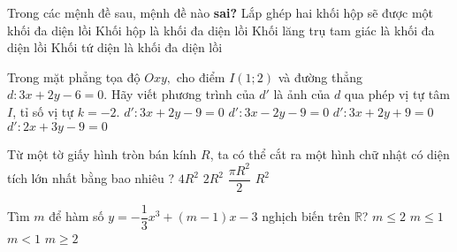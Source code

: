 \begin{ex}%
Trong các mệnh đề sau, mệnh đề nào {\textbf{sai?}}
	\choice
	{\True Lắp ghép hai khối hộp sẽ được một khối đa diện lồi}
	{Khối hộp là khối đa diện lồi}
	{Khối lăng trụ tam giác là khối đa diện lồi}
	{Khối tứ diện là khối đa diện lồi}
	\loigiai{
	}
	
\end{ex}
\begin{ex}%
Trong mặt phẳng tọa độ $Oxy,$ cho điểm $I\left(1;2 \right)$ và đường thẳng $d: 3x+2y-6=0.$ Hãy viết phương trình của $d'$ là ảnh của $d$ qua phép vị tự tâm $I$, tỉ số vị tự $k=-2$.
\choice
{\True $d':3x+2y-9=0$}
{$d':3x-2y-9=0$}
{$d':3x+2y+9=0$}
{$d':2x+3y-9=0$}
\end{ex}
\begin{ex}%
Từ một tờ giấy hình tròn bán kính $R$, ta có thể cắt ra một hình chữ nhật có diện tích lớn nhất bằng bao nhiêu ?
\choice
{$4R^2$}
{\True $2R^2$}
{$\dfrac{\pi R^2}{2}$}
{$R^2$}
\end{ex}
\begin{ex}%
Tìm $m$ để hàm số $y=-\dfrac{1}{3}x^3 +\left(m-1\right)x -3$ nghịch biến trên $\mathbb{R}$?
\choice
{$m \leq 2$}
{\True $m \leq 1$}
{$m < 1$}
{$m \geq 2$}
\end{ex}
